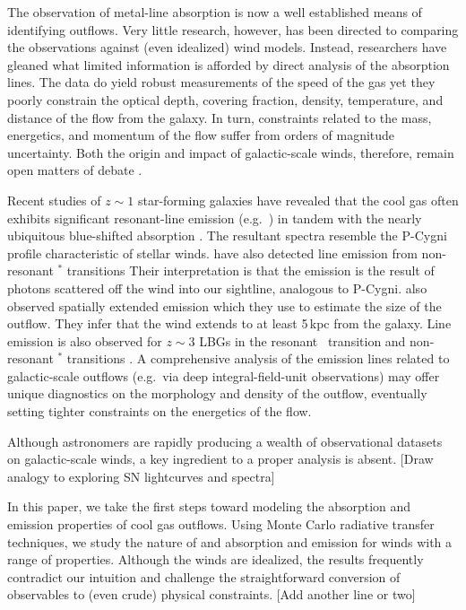 \documentclass[12pt,preprint]{aastex}
\begin{document}
The observation of metal-line absorption is now a well established
means of identifying outflows. Very little research,
however,  has been directed
to comparing the observations against (even idealized) wind
models.  Instead, researchers have gleaned what limited information
is afforded by direct analysis of the absorption lines.  The data do yield
robust measurements of the speed of the gas yet they poorly constrain the
optical depth, covering fraction, density, temperature, and distance
of the flow from the galaxy.   In turn, constraints related to the
mass, energetics, and momentum of the flow suffer from
orders of magnitude uncertainty.  Both the origin and impact of
galactic-scale winds, therefore, remain open matters of debate
\citep{debate}.

Recent studies of $z \sim 1$ star-forming galaxies have revealed that
the cool gas often exhibits significant resonant-line emission (e.g.\
) in
tandem with the nearly ubiquitous blue-shifted absorption
\citep{wcp+09,rubin09,rubin+10b}.  The resultant spectra resemble the P-Cygni
profile characteristic of stellar winds.
\cite{rubin+10a} have also detected line
emission from non-resonant $^*$ transitions 
Their interpretation is that the emission is the result of photons
scattered off the wind into our sightline, analogous to P-Cygni.
\cite{rubin+10a} also observed spatially extended \ion{Mg}{2} emission
which they use to estimate the size of the outflow.  They infer that
the wind extends to at least 5\,kpc from the galaxy.  Line emission is
also observed for $z \sim 3$ LBGs in the resonant \lya\ transition
and non-resonant \ion{Si}{2}$^*$ transitions \citep{prs+02,shapley03}.
A comprehensive analysis of the emission lines
related to galactic-scale outflows
(e.g.\ via deep integral-field-unit observations) may offer unique
diagnostics on the morphology and density of the outflow, eventually
setting tighter constraints on the energetics of the flow.  

Although astronomers are rapidly producing a wealth of observational
datasets on galactic-scale winds, a key ingredient to a proper
analysis is absent.
[Draw analogy to exploring SN lightcurves and spectra]

In this paper, we take the first steps toward modeling the absorption
and emission properties of cool gas outflows.  Using Monte Carlo
radiative transfer techniques, we study the nature of \ion{Mg}{2} and
\ion{Fe}{2} absorption and emission for winds with a range of
properties.  Although the winds are idealized, the results frequently
contradict our intuition and 
challenge the straightforward conversion of observables to (even crude) physical
constraints.  [Add another line or two]
\end{document}
